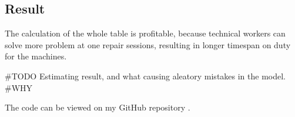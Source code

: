 	\subsection{Result}
The calculation of the whole table is profitable, because technical workers can solve more problem at one repair sessions, resulting in longer timespan on duty for the machines.

\#TODO Estimating result, and what causing aleatory mistakes in the model. 
\#WHY

The code can be viewed on my GitHub repository \cite{GitHub_FP_RUL}.
